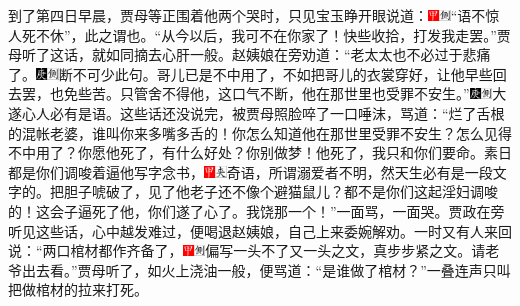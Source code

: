 到了第四日早晨，贾母等正围着他两个哭时，只见宝玉睁开眼说道：{\includegraphics[width=3mm]{../Images/00002}\includegraphics[width=3mm]{../Images/00011}\footnotesize \kaishu “语不惊人死不休”，此之谓也。}“从今以后，我可不在你家了！快些收拾，打发我走罢。”贾母听了这话，就如同摘去心肝一般。赵姨娘在旁劝道：“老太太也不必过于悲痛了。{\includegraphics[width=3mm]{../Images/00004}\includegraphics[width=3mm]{../Images/00011}\footnotesize \kaishu 断不可少此句。}哥儿已是不中用了，不如把哥儿的衣裳穿好，让他早些回去罢，也免些苦。只管舍不得他，这口气不断，他在那世里也受罪不安生。”{\includegraphics[width=3mm]{../Images/00004}\includegraphics[width=3mm]{../Images/00011}\footnotesize \kaishu 大遂心人必有是语。}这些话还没说完，被贾母照脸啐了一口唾沫，骂道：“烂了舌根的混帐老婆，谁叫你来多嘴多舌的！你怎么知道他在那世里受罪不安生？怎么见得不中用了？你愿他死了，有什么好处？你别做梦！他死了，我只和你们要命。素日都是你们调唆着逼他写字念书，{\includegraphics[width=3mm]{../Images/00002}\includegraphics[width=3mm]{../Images/00012}\footnotesize \kaishu 奇语，所谓溺爱者不明，然天生必有是一段文字的。}把胆子唬破了，见了他老子还不像个避猫鼠儿？都不是你们这起淫妇调唆的！这会子逼死了他，你们遂了心了。我饶那一个！”一面骂，一面哭。贾政在旁听见这些话，心中越发难过，便喝退赵姨娘，自己上来委婉解劝。一时又有人来回说：“两口棺材都作齐备了，{\includegraphics[width=3mm]{../Images/00002}\includegraphics[width=3mm]{../Images/00011}\footnotesize \kaishu 偏写一头不了又一头之文，真步步紧之文。}请老爷出去看。”贾母听了，如火上浇油一般，便骂道：“是谁做了棺材？”一叠连声只叫把做棺材的拉来打死。

